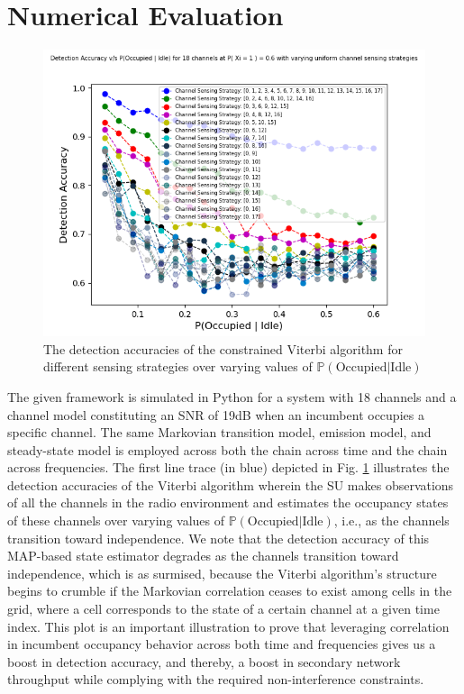 \documentclass[10pt,twocolumn]{IEEEtran}
\begin{document}
\section{Numerical Evaluation}\label{IV}
\begin{figure}
    \centering
    \includegraphics[scale=0.5]{Uniform_Channel_Sensing.png}
    \caption{The detection accuracies of the constrained Viterbi algorithm for different sensing strategies over varying values of $\mathbb{P}(\text{Occupied}|\text{Idle})$}
    \label{fig:2}
\end{figure}
The given framework is simulated in Python for a system with 18 channels and a channel model constituting an SNR of 19dB when an incumbent occupies a specific channel. The same Markovian transition model, emission model, and steady-state model is employed across both the chain across time and the chain across frequencies. The first line trace (in blue) depicted in Fig. \ref{fig:2} illustrates the detection accuracies of the Viterbi algorithm wherein the SU makes observations of all the channels in the radio environment and estimates the occupancy states of these channels over varying values of $\mathbb{P}(\text{Occupied}|\text{Idle})$, i.e., as the channels transition toward independence. We note that the detection accuracy of this MAP-based state estimator degrades as the channels transition toward independence, which is as surmised, because the Viterbi algorithm's structure begins to crumble if the Markovian correlation ceases to exist among cells in the grid, where a cell corresponds to the state of a certain channel at a given time index. This plot is an important illustration to prove that leveraging correlation in incumbent occupancy behavior across both time and frequencies gives us a boost in detection accuracy, and thereby, a boost in secondary network throughput while complying with the required non-interference constraints.
\end{document}
